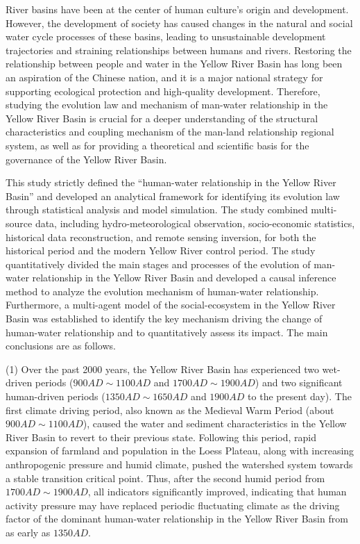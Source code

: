 \begin{eabstract}
  River basins have been at the center of human culture's origin and development. However, the development of society has caused changes in the natural and social water cycle processes of these basins, leading to unsustainable development trajectories and straining relationships between humans and rivers. Restoring the relationship between people and water in the Yellow River Basin has long been an aspiration of the Chinese nation, and it is a major national strategy for supporting ecological protection and high-quality development. Therefore, studying the evolution law and mechanism of man-water relationship in the Yellow River Basin is crucial for a deeper understanding of the structural characteristics and coupling mechanism of the man-land relationship regional system, as well as for providing a theoretical and scientific basis for the governance of the Yellow River Basin.

  This study strictly defined the ``human-water relationship in the Yellow River Basin'' and developed an analytical framework for identifying its evolution law through statistical analysis and model simulation. The study combined multi-source data, including hydro-meteorological observation, socio-economic statistics, historical data reconstruction, and remote sensing inversion, for both the historical period and the modern Yellow River control period. The study quantitatively divided the main stages and processes of the evolution of man-water relationship in the Yellow River Basin and developed a causal inference method to analyze the evolution mechanism of human-water relationship. Furthermore, a multi-agent model of the social-ecosystem in the Yellow River Basin was established to identify the key mechanism driving the change of human-water relationship and to quantitatively assess its impact. The main conclusions are as follows.

  (1) Over the past 2000 years, the Yellow River Basin has experienced two wet-driven periods ($900AD \sim 1100AD$ and $1700AD \sim 1900AD$) and two significant human-driven periods ($1350AD \sim 1650AD$ and $1900AD$ to the present day). The first climate driving period, also known as the Medieval Warm Period (about $900AD \sim 1100AD$), caused the water and sediment characteristics in the Yellow River Basin to revert to their previous state. Following this period, rapid expansion of farmland and population in the Loess Plateau, along with increasing anthropogenic pressure and humid climate, pushed the watershed system towards a stable transition critical point. Thus, after the second humid period from $1700AD \sim 1900AD$, all indicators significantly improved, indicating that human activity pressure may have replaced periodic fluctuating climate as the driving factor of the dominant human-water relationship in the Yellow River Basin from as early as $1350AD$.


\end{eabstract}
